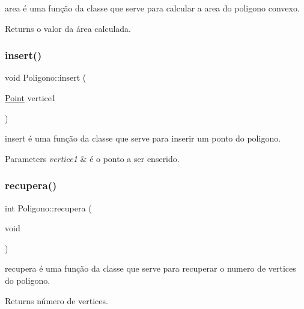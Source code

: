 area é uma função da classe que serve para calcular a area do poligono convexo. 

\begin{DoxyReturn}{Returns}
o valor da área calculada. 
\end{DoxyReturn}
\mbox{\label{class_poligono_a3fb101362b44fb9682e33cba0d3cd5ed}} 
\subsubsection{\texorpdfstring{insert()}{insert()}}
{\footnotesize\ttfamily void Poligono\+::insert (\begin{DoxyParamCaption}\item[{\mbox{\hyperlink{class_point}{Point}}}]{vertice1 }\end{DoxyParamCaption})}



insert é uma função da classe que serve para inserir um ponto do poligono. 


\begin{DoxyParams}{Parameters}
{\em vertice1} & é o ponto a ser enserido. \\
\hline
\end{DoxyParams}
\mbox{\label{class_poligono_a81116a54985e6e897bd785268ba35a6e}} 
\subsubsection{\texorpdfstring{recupera()}{recupera()}}
{\footnotesize\ttfamily int Poligono\+::recupera (\begin{DoxyParamCaption}\item[{void}]{ }\end{DoxyParamCaption})}



recupera é uma função da classe que serve para recuperar o numero de vertices do poligono. 

\begin{DoxyReturn}{Returns}
número de vertices. 
\end{DoxyReturn}
\mbox{\label{class_poligono_a2d58ed88cb9be91bb0047984dc1dd054}} 
